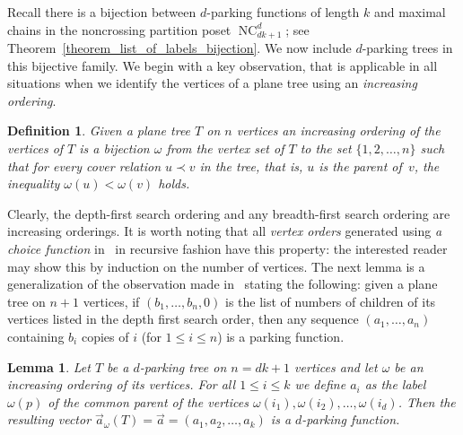 \documentclass[11pt]{amsart}
\newtheorem{definition}[theorem]{Definition}
\newtheorem{lemma}[theorem]{Lemma}
\numberwithin{equation}{section}
\DeclareMathOperator{\NC}{NC}
\begin{document}
Recall there is a bijection between $d$-parking functions of length $k$ and
maximal chains in the noncrossing partition poset $\NC^{d}_{dk+1}$;
see Theorem~\ref{theorem_list_of_labels_bijection}.
We now include $d$-parking trees in this bijective family.
We begin with a key observation, that is applicable in all situations
when we identify the vertices of a plane tree using an {\em increasing ordering}.  
\begin{definition}
Given a plane tree $T$ on $n$ vertices an {\em increasing ordering} of the
vertices of $T$ is a bijection $\omega$ from the vertex set of $T$ to
the set $\{1,2,\ldots,n\}$ such that for every cover relation $u \prec v$ in the tree,
that is, $u$ is the parent of~$v$, the inequality $\omega(u) < \omega(v)$ holds.
\end{definition}  
Clearly, the depth-first search ordering and any breadth-first search
ordering are increasing orderings. It is worth noting that all {\em vertex
  orders} generated using {\em a choice function} in~\cite[Section
  13.2.3]{Yan_chapter} in recursive fashion have this property: the
interested reader may show this by induction on the number of vertices.    
The next lemma is a generalization of the observation made
in~\cite[Section~6.4, Exercise~31, solution (a)]{Knuth} stating the
following: given a plane tree on $n+1$ vertices, if
$(b_{1},\ldots,b_{n},0)$ is the list of numbers of children of its
vertices listed in the depth first search order, then any sequence
$(a_{1},\ldots,a_{n})$ containing $b_{i}$ copies of $i$ (for $1\leq i\leq
n$) is a parking function.  
\begin{lemma}
\label{lemma_parking}
Let $T$ be a $d$-parking tree on $n=dk+1$ vertices and let $\omega$ be
an increasing ordering of its vertices. For all $1 \leq i \leq k$
we define $a_{i}$ as the label $\omega(p)$ of the common parent of the
vertices $\omega(i_{1}),\omega(i_{2}), \ldots, \omega(i_{d})$.
Then the resulting vector $\vec{a}_{\omega}(T) = \vec{a} = (a_{1},a_{2}, \ldots, a_{k})$ is a
$d$-parking function. 
\end{lemma}  
\end{document}
